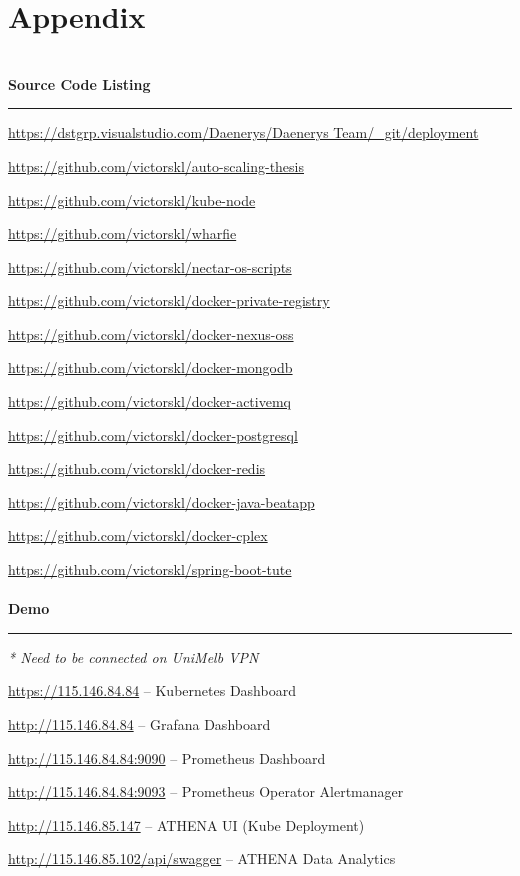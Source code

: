 
\chapter{Appendix} %

\label{AppendixA} %

\hfill
\\
\textbf{Source Code Listing}
\\
\hrule
\hfill

\url{https://dstgrp.visualstudio.com/Daenerys/Daenerys Team/_git/deployment}

\url{https://github.com/victorskl/auto-scaling-thesis}

\url{https://github.com/victorskl/kube-node}

\url{https://github.com/victorskl/wharfie}

\url{https://github.com/victorskl/nectar-os-scripts}

\url{https://github.com/victorskl/docker-private-registry}

\url{https://github.com/victorskl/docker-nexus-oss}

\url{https://github.com/victorskl/docker-mongodb}

\url{https://github.com/victorskl/docker-activemq}

\url{https://github.com/victorskl/docker-postgresql}

\url{https://github.com/victorskl/docker-redis}

\url{https://github.com/victorskl/docker-java-beatapp}

\url{https://github.com/victorskl/docker-cplex}

\url{https://github.com/victorskl/spring-boot-tute}
\\
\\
\noindent \textbf{Demo}
\\
\hrule
\hfill

\textit{* Need to be connected on UniMelb VPN}
\hfill

\url{https://115.146.84.84} -- Kubernetes Dashboard

\url{http://115.146.84.84} -- Grafana Dashboard

\url{http://115.146.84.84:9090} -- Prometheus Dashboard

\url{http://115.146.84.84:9093} -- Prometheus Operator Alertmanager

\url{http://115.146.85.147} -- ATHENA UI (Kube Deployment)

\url{http://115.146.85.102/api/swagger} -- ATHENA Data Analytics







